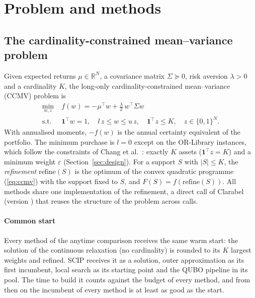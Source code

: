 \section{Problem and methods}\label{sec:methods}

\subsection{The cardinality-constrained mean--variance problem}\label{sec:problem}

Given expected returns $\mu \in \mathbb{R}^N$, a covariance matrix $\Sigma \succeq 0$, risk aversion $\lambda > 0$ and
a cardinality $K$, the long-only cardinality-constrained mean--variance (CCMV) problem is
\begin{equation}\label{eq:ccmv}
\begin{aligned}
\min_{w, z}\;& f(w) = -\mu^{\top} w + \frac{\lambda}{2}\, w^{\top}\Sigma w\\
\text{s.t.}\;& \mathbf{1}^{\top} w = 1,\quad l\, z \le w \le u\, z,\quad
\mathbf{1}^{\top} z \le K,\quad z \in \{0, 1\}^N .
\end{aligned}
\end{equation}
With annualised moments, $-f(w)$ is the annual certainty equivalent of the portfolio. The minimum purchase is $l = 0$
except on the OR-Library instances, which follow the constraints of Chang et al.~\cite{chang2000heuristics}: exactly
$K$ assets ($\mathbf{1}^{\top} z = K$) and a minimum weight $\varepsilon$ (Section~\ref{sec:design}). For a support
$S$ with $|S| \le K$, the \emph{refinement} $\mathrm{refine}(S)$ is the optimum of the convex quadratic programme
(\ref{eq:ccmv}) with the support fixed to $S$, and $F(S) = f(\mathrm{refine}(S))$. All methods share one
implementation of the refinement, a direct call of Clarabel~\cite{goulart2026clarabel} (version ) that
reuses the structure of the problem across calls.

\paragraph{Common start} Every method of the anytime comparison receives the same warm start: the solution of the
continuous relaxation (no cardinality) is rounded to its $K$ largest weights and refined. SCIP receives it as a
solution, outer approximation as its first incumbent, local search as its starting point and the QUBO pipeline in its
pool. The time to build it counts against the budget of every method, and from then on the incumbent of every method
is at least as good as the start.

